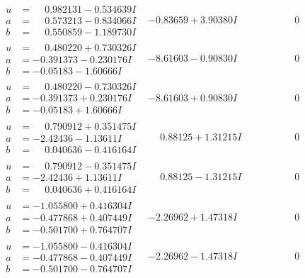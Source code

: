 \documentclass[1p]{elsarticle_modified}
\theoremstyle{definition}
\begin{document}
$$\begin{array}{c|c|c}
\begin{aligned}
u &= \phantom{-}0.982131 - 0.534639 I \\
a &= \phantom{-}0.573213 - 0.834066 I \\
b &= \phantom{-}0.550859 - 1.189730 I\end{aligned}
 & -0.83659 + 3.90380 I & \phantom{-0.000000 } 0 \\ \hline\begin{aligned}
u &= \phantom{-}0.480220 + 0.730326 I \\
a &= -0.391373 - 0.230176 I \\
b &= -0.05183 - 1.60666 I\end{aligned}
 & -8.61603 - 0.90830 I & \phantom{-0.000000 } 0 \\ \hline\begin{aligned}
u &= \phantom{-}0.480220 - 0.730326 I \\
a &= -0.391373 + 0.230176 I \\
b &= -0.05183 + 1.60666 I\end{aligned}
 & -8.61603 + 0.90830 I & \phantom{-0.000000 } 0 \\ \hline\begin{aligned}
u &= \phantom{-}0.790912 + 0.351475 I \\
a &= -2.42436 - 1.13611 I \\
b &= \phantom{-}0.040636 - 0.416164 I\end{aligned}
 & \phantom{-}0.88125 + 1.31215 I & \phantom{-0.000000 } 0 \\ \hline\begin{aligned}
u &= \phantom{-}0.790912 - 0.351475 I \\
a &= -2.42436 + 1.13611 I \\
b &= \phantom{-}0.040636 + 0.416164 I\end{aligned}
 & \phantom{-}0.88125 - 1.31215 I & \phantom{-0.000000 } 0 \\ \hline\begin{aligned}
u &= -1.055800 + 0.416304 I \\
a &= -0.477868 + 0.407449 I \\
b &= -0.501700 + 0.764707 I\end{aligned}
 & -2.26962 + 1.47318 I & \phantom{-0.000000 } 0 \\ \hline\begin{aligned}
u &= -1.055800 - 0.416304 I \\
a &= -0.477868 - 0.407449 I \\
b &= -0.501700 - 0.764707 I\end{aligned}
 & -2.26962 - 1.47318 I & \phantom{-0.000000 } 0 \\ \hline\begin{aligned}

\end{aligned}
\end{array}$$
\end{document}
